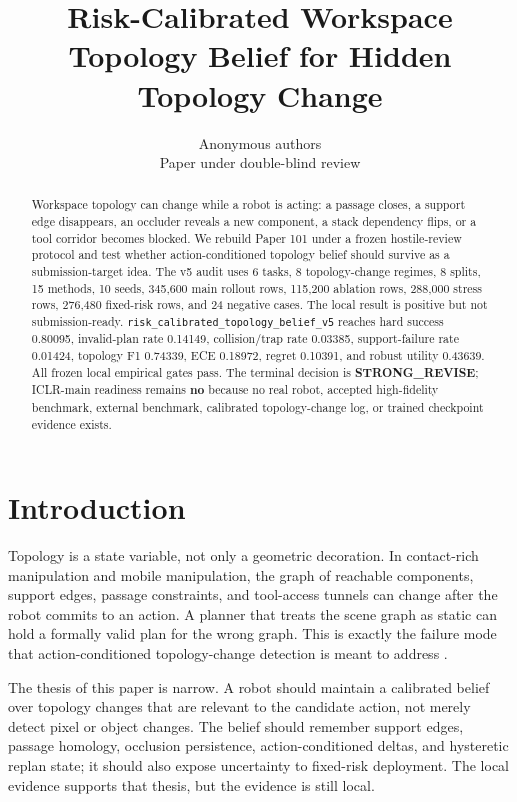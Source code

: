 \documentclass{article}
\title{Risk-Calibrated Workspace Topology Belief for Hidden Topology Change}
\author{Anonymous authors\\Paper under double-blind review}
\begin{document}
\maketitle

\begin{abstract}
Workspace topology can change while a robot is acting: a passage closes, a support edge disappears, an occluder reveals a new component, a stack dependency flips, or a tool corridor becomes blocked. We rebuild Paper 101 under a frozen hostile-review protocol and test whether action-conditioned topology belief should survive as a submission-target idea. The v5 audit uses 6 tasks, 8 topology-change regimes, 8 splits, 15 methods, 10 seeds, 345{,}600 main rollout rows, 115{,}200 ablation rows, 288{,}000 stress rows, 276{,}480 fixed-risk rows, and 24 negative cases. The local result is positive but not submission-ready. \texttt{risk\_calibrated\_topology\_belief\_v5} reaches hard success 0.80095, invalid-plan rate 0.14149, collision/trap rate 0.03385, support-failure rate 0.01424, topology F1 0.74339, ECE 0.18972, regret 0.10391, and robust utility 0.43639. All frozen local empirical gates pass. The terminal decision is \textbf{STRONG\_REVISE}; ICLR-main readiness remains \textbf{no} because no real robot, accepted high-fidelity benchmark, external benchmark, calibrated topology-change log, or trained checkpoint evidence exists.
\end{abstract}

\section{Introduction}
Topology is a state variable, not only a geometric decoration. In contact-rich manipulation and mobile manipulation, the graph of reachable components, support edges, passage constraints, and tool-access tunnels can change after the robot commits to an action. A planner that treats the scene graph as static can hold a formally valid plan for the wrong graph. This is exactly the failure mode that action-conditioned topology-change detection is meant to address \citep{yang2022scene1,fyleris2022urban2,guo2026ssprcd3,doi2022detecting4,cheng2024change5,mehan2024questmaps6}.

The thesis of this paper is narrow. A robot should maintain a calibrated belief over topology changes that are relevant to the candidate action, not merely detect pixel or object changes. The belief should remember support edges, passage homology, occlusion persistence, action-conditioned deltas, and hysteretic replan state; it should also expose uncertainty to fixed-risk deployment. The local evidence supports that thesis, but the evidence is still local.
\end{document}
